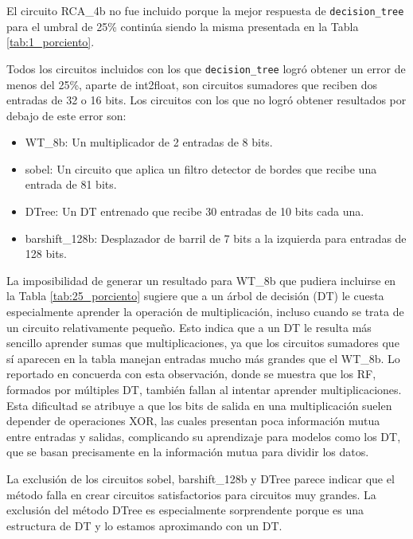 El circuito RCA\_4b no fue incluido porque la mejor respuesta de
\texttt{decision\_tree} para el umbral de 25\% continúa siendo la misma
presentada en la Tabla \ref{tab:1_porciento}.

Todos los circuitos incluidos con los que \texttt{decision\_tree} logró obtener
un error de menos del 25\%, aparte de int2float, son circuitos sumadores que
reciben dos entradas de 32 o 16 bits.
Los circuitos con los que no logró obtener resultados por debajo de este error
son:

\begin{itemize}
  \item WT\_8b: Un multiplicador de 2 entradas de 8 bits.
  \item sobel: Un circuito que aplica un filtro detector de bordes que recibe
    una entrada de 81 bits.
  \item DTree: Un DT entrenado que recibe 30 entradas de 10 bits cada una.
  \item barshift\_128b: Desplazador de barril de 7 bits a la izquierda para entradas de 128 bits.
\end{itemize}


La imposibilidad de generar un resultado para WT\_8b que pudiera incluirse en la
Tabla \ref{tab:25_porciento} sugiere que a un árbol de decisión (DT) le cuesta
especialmente aprender la operación de multiplicación, incluso cuando se trata
de un circuito relativamente pequeño. Esto indica que a un DT le resulta más
sencillo aprender sumas que multiplicaciones, ya que los circuitos sumadores
que sí aparecen en la tabla manejan entradas mucho más grandes que el WT\_8b.
Lo reportado en \cite{miyasaka_logic_2021} concuerda con esta observación,
donde se muestra que los RF, formados por múltiples DT, también fallan al
intentar aprender multiplicaciones. Esta dificultad se atribuye a que los bits
de salida en una multiplicación suelen depender de operaciones XOR, las cuales
presentan poca información mutua entre entradas y salidas, complicando su
aprendizaje para modelos como los DT, que se basan precisamente en la
información mutua para dividir los datos.

La exclusión de los circuitos sobel, barshift\_128b y DTree parece indicar que
el método falla en crear circuitos satisfactorios para circuitos muy grandes.
La exclusión del método DTree es especialmente sorprendente porque es una
estructura de DT y lo estamos aproximando con un DT.


